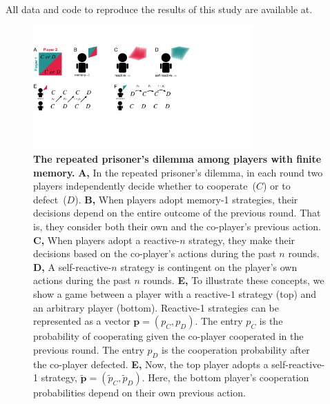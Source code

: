 \documentclass[11pt]{article}
\begin{document}
All data and code to reproduce the results of this study are available at.

{\setlength{\bibsep}{0\baselineskip}


}


\clearpage
\newpage

\begin{figure}[t]
  \centering
  \includegraphics[width=0.75\textwidth]{figures/conceptual_figure.pdf}
  \caption{\textbf{The repeated prisoner's dilemma among players with finite memory.}
  \textbf{A,} In the repeated prisoner's dilemma, in each round two players independently decide whether to cooperate~($C$) or to defect~($D$). 
   \textbf{B,} When players adopt memory-1 strategies, their decisions depend on the entire outcome of the previous round. That is, they consider both their own and the co-player's previous action. 
   \textbf{C,} When players adopt a reactive-$n$ strategy, they make their decisions based on the co-player's actions during the past $n$ rounds. 
   \textbf{D,} A self-reactive-$n$ strategy is contingent on the player's own actions during the past $n$ rounds. 
   \textbf{E,} To illustrate these concepts, we show a game between a player with a reactive-$1$ strategy (top) and an arbitrary player (bottom). 
   Reactive-1 strategies can be represented as a vector  $\mathbf{p} \!=\! (p_C, p_D)$. 
   The entry $p_C$ is the probability of cooperating given the co-player cooperated in the previous round.
   The entry $p_D$ is the cooperation probability after the co-player defected. 
   \textbf{E,} Now, the top player adopts a self-reactive-1 strategy, $\mathbf{\tilde p}\!=\!(\tilde p_C, \tilde p_D)$. 
   Here, the bottom player's cooperation probabilities depend on their own previous action.
   }\label{fig:conceptual_figure_model}
\end{figure}
\end{document}
